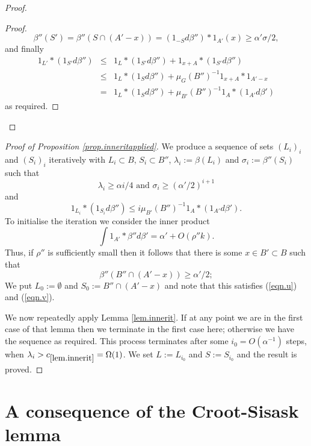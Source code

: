 \documentclass[12pt]{amsart}  %
\begin{document}
\begin{proof}
\begin{proof}
\begin{equation*}
\beta''(S') = \beta''(S \cap (A'-x)) =  (1_{-S}d\beta'') \ast 1_{A'} (x) \geq \alpha'\sigma/2,
\end{equation*}
and finally
\begin{eqnarray*}
1_{L'} \ast (1_{S'}d\beta'') &\leq & 1_L \ast (1_{S'}d\beta'') + 1_{x+A} \ast (1_{S'}d\beta'')\\ & \leq & 1_L \ast (1_Sd\beta'') + \mu_{G}(B'')^{-1}1_{x+A} \ast 1_{A'-x}\\ & = & 1_L \ast (1_Sd\beta'') + \mu_{B'}(B'')^{-1}1_{A} \ast (1_{A'}d\beta')
\end{eqnarray*}
as required.
\end{proof}
\end{proof}
\begin{proof}[Proof of Proposition \ref{prop.inneritapplied}]
We produce a sequence of sets $(L_i)_i$ and $(S_i)_i$ iteratively with $L_i \subset B$, $S_i \subset B''$, $\lambda_i:=\beta(L_i)$ and $\sigma_i:=\beta''(S_i)$ such that
\begin{equation}\label{eqn.u}
\lambda_i \geq \alpha i /4 \textrm{ and } \sigma_i \geq (\alpha'/2)^{i+1}
\end{equation}
and
\begin{equation}\label{eqn.v}
1_{L_i} \ast (1_{S_i}d\beta'') \leq i\mu_{B'}(B'')^{-1}1_A \ast (1_{A'}d\beta').
\end{equation}
To initialise the iteration we consider the inner product
\begin{equation*}
\int{1_{A'} \ast \beta''d\beta'} = \alpha' + O(\rho '' k).
\end{equation*}
Thus, if $\rho''$ is sufficiently small then it follows that there is some $x \in B' \subset B$ such that
\begin{equation*}
\beta''(B''\cap (A'-x)) \geq \alpha'/2;
\end{equation*}
We put $L_0:=\emptyset$ and $S_0:=B'' \cap (A'-x)$ and note that this satisfies (\ref{eqn.u}) and (\ref{eqn.v}).

We now repeatedly apply Lemma \ref{lem.innerit}.  If at any point we are in the first case of that lemma then we terminate in the first case here; otherwise we have the sequence as required.  This process terminates after some $i_0=O(\alpha^{-1})$ steps, when $\lambda_i > c_{\ref{lem.innerit}} = \Omega(1)$.  We set $L:=L_{i_0}$ and $S:=S_{i_0}$ and the result is proved.
\end{proof}

\section{A consequence of the Croot-Sisask lemma}\label{sec.bcs}
\end{document}
